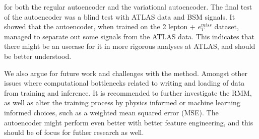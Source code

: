 for both the regular autoencoder and the variational autoencoder. The final test of the autoencoder 
was a blind test with ATLAS data and BSM signals. It showed that the autoencoder, when trained on 
the 2 lepton + $e_T^{miss}$ dataset, managed to separate out some signals from the ATLAS data. 
This indicates that there might be an usecase for it in more rigorous analyses at ATLAS, and 
should be better understood. \par 
We also argue for future work and challenges with the method. Amongst other 
issues where computational bottlenecks related to writing and loading of data from training 
and inference. It is recommended to further investigate the RMM, as well as alter 
the training process by physics informed or machine learning informed choices, such as a 
weighted mean squared error (MSE). The autoencoder might perform even better with better feature engineering, and 
this should be of focus for futher research as well. 